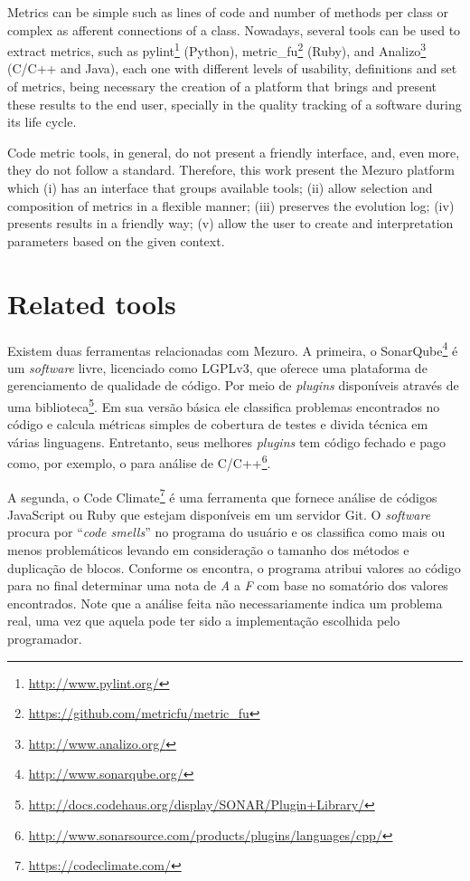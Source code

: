 \documentclass{llncs}
\begin{document}
Metrics can be simple such as lines of code and number of methods per class or
complex as afferent connections of a class. Nowadays, several tools can be
used to extract metrics, such as
pylint\footnote{\url{http://www.pylint.org/}} (Python),
metric\_fu\footnote{\url{https://github.com/metricfu/metric_fu}} (Ruby), and
Analizo\footnote{\url{http://www.analizo.org/}} (C/C++ and Java), each one with
different levels of usability, definitions and set of metrics, being necessary
the creation of a platform that brings and present these results to the end
user, specially in the quality tracking of a software during its life cycle.

Code metric tools, in general, do not present a friendly interface, and,
even more, they do not follow a standard. Therefore, this work present the
Mezuro platform which (i) has an interface that groups available tools;
(ii) allow selection and composition of metrics in a flexible manner;
(iii) preserves the evolution log;
(iv) presents results in a friendly way;
(v) allow the user to create and interpretation parameters based on the given
context.

\section{Related tools}

Existem duas ferramentas relacionadas com Mezuro. A primeira, o
SonarQube\footnote{\url{http://www.sonarqube.org/}} é um \textit{software}
livre, licenciado como LGPLv3, que oferece uma plataforma de gerenciamento de
qualidade de código. Por meio de \textit{plugins} disponíveis através de uma
biblioteca\footnote{\url{http://docs.codehaus.org/display/SONAR/Plugin+Library/}}.
Em sua versão básica ele classifica problemas encontrados no código e calcula
métricas simples de cobertura de testes e divida técnica em várias linguagens.
Entretanto, seus melhores \textit{plugins} tem código fechado e pago como, por
exemplo, o para análise de
C/C++\footnote{\url{http://www.sonarsource.com/products/plugins/languages/cpp/}}.

A segunda, o Code Climate\footnote{\url{https://codeclimate.com/}} é uma
ferramenta que fornece análise de códigos JavaScript ou Ruby que estejam
disponíveis em um servidor Git. O \textit{software} procura por ``\textit{code
smells}'' no programa do usuário e os classifica como mais ou menos
problemáticos levando em consideração o tamanho dos métodos e duplicação de
blocos. Conforme os encontra, o programa atribui valores ao código para no
final determinar uma nota de \textit{A} a \textit{F} com base no somatório dos
valores encontrados. Note que a análise feita não necessariamente indica um
problema real, uma vez que aquela pode ter sido a implementação escolhida pelo
programador.
\end{document}
